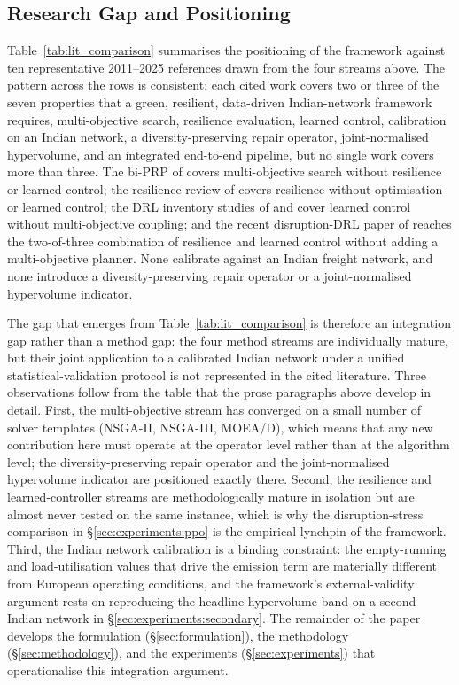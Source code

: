 \documentclass[review,preprint,authoryear,12pt]{elsarticle}
\begin{document}
\subsection{Research Gap and Positioning}
\label{sec:lit:gap}

Table~\ref{tab:lit_comparison} summarises the positioning of the
framework against ten representative 2011--2025 references drawn from
the four streams above. The pattern across the rows is consistent:
each cited work covers two or three of the seven properties that a
green, resilient, data-driven Indian-network framework requires,
multi-objective search, resilience evaluation, learned control,
calibration on an Indian network, a diversity-preserving repair
operator, joint-normalised hypervolume, and an integrated end-to-end
pipeline, but no single work covers more than three. The bi-PRP of
\citet{demir2014bi_objective_prp} covers multi-objective search
without resilience or learned control; the resilience review of
\citet{hosseini2019review} covers resilience without optimisation or
learned control; the DRL inventory studies of
\citet{boute2022drl_inventory} and \citet{gijsbrechts2022drl_inventory}
cover learned control without multi-objective coupling; and the
recent disruption-DRL paper of \citet{yang2024drl_disruption}
reaches the two-of-three combination of resilience and learned
control without adding a multi-objective planner. None calibrate
against an Indian freight network, and none introduce a
diversity-preserving repair operator or a joint-normalised
hypervolume indicator.

The gap that emerges from Table~\ref{tab:lit_comparison} is therefore
an integration gap rather than a method gap: the four method streams
are individually mature, but their joint application to a calibrated
Indian network under a unified statistical-validation protocol is not
represented in the cited literature. Three observations follow from
the table that the prose paragraphs above develop in detail. First,
the multi-objective stream has converged on a small number of solver
templates (NSGA-II, NSGA-III, MOEA/D), which means that any new
contribution here must operate at the operator level rather than at
the algorithm level; the diversity-preserving repair operator and
the joint-normalised hypervolume indicator are positioned exactly
there. Second, the resilience and learned-controller streams are
methodologically mature in isolation but are almost never tested on
the same instance, which is why the disruption-stress comparison in
\S\ref{sec:experiments:ppo} is the empirical lynchpin of the
framework. Third, the Indian network calibration is a binding
constraint: the empty-running and load-utilisation values that drive
the emission term are materially different from European operating
conditions, and the framework's external-validity argument rests on
reproducing the headline hypervolume band on a second Indian network
in \S\ref{sec:experiments:secondary}. The remainder of the paper
develops the formulation (\S\ref{sec:formulation}), the methodology
(\S\ref{sec:methodology}), and the experiments
(\S\ref{sec:experiments}) that operationalise this integration
argument.
\end{document}
